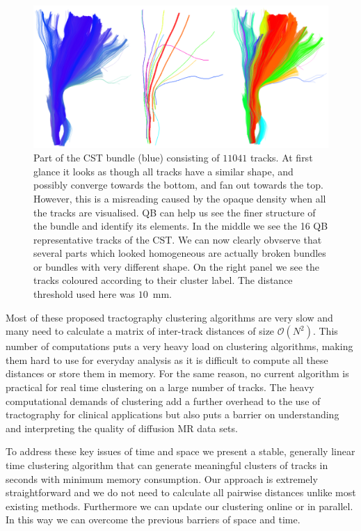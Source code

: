 \documentclass{bioinfo}
\begin{document}
%
\begin{figure}[htp]
\centerline{\includegraphics[width=160mm]{Figures/Fig_4_cst_simplification_relabeled_triple.eps}}
\caption{Part of the CST bundle (blue) consisting of $11041$ tracks. At first glance it looks as though all tracks
  have a similar shape, and possibly converge towards the bottom, and
  fan out towards the top. However, this is a misreading caused by the
  opaque density when all the tracks are visualised.  QB can help us see
  the finer structure of the bundle and identify its elements. In the middle we see the 16 QB representative tracks of the CST. We can now clearly obvserve that several parts which looked homogeneous are
  actually broken bundles or bundles with very different shape. On the right panel we see the tracks coloured according to their cluster label. The distance threshold used here was $10$~mm. \label{Flo:cst_pbc}}
\end{figure}

Most of these proposed tractography clustering algorithms are very slow and many
need to calculate a matrix of inter-track distances of size $\mathcal{O}(N^2)$.
This number of computations puts a very heavy load on clustering algorithms,
making them hard to use for everyday analysis as it is difficult to compute all
these distances or store them in memory. For the same reason, no current
algorithm is practical for real time clustering on a large number of tracks. The
heavy computational demands of clustering add a further overhead to the use of
tractography for clinical applications but also puts a barrier on understanding
and interpreting the quality of diffusion MR data sets.

To address these key issues of time and space we present a stable,
generally linear time clustering algorithm that can generate meaningful
clusters of tracks in seconds with minimum memory consumption. Our
approach is extremely straightforward and we do not need to calculate
all pairwise distances unlike most existing
methods. Furthermore we can update our clustering online or in
parallel. In this way we can overcome the previous barriers of space and
time.
\end{document}
